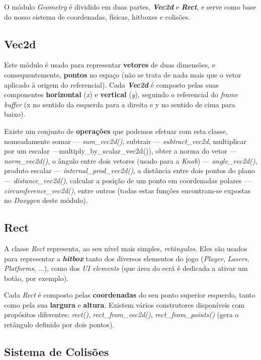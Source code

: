 \documentclass{report}
\begin{document}
O módulo \textit{Geometry} é dividido em duas partes, \textbf{\textit{Vec2d}} e \textbf{\textit{Rect}}, e serve como base do nosso sistema de coordenadas, físicas, hitboxes e colisões. 
\subsection{Vec2d}

Este módulo é usado para representar \textbf{vetores} de duas dimensões, e consequentemente, \textbf{pontos} no espaço (não se trata de nada mais que o vetor aplicado à origem do referencial). Cada \textbf{\textit{Vec2d}} é composto pelas suas componentes \textbf{horizontal} (\textit{x}) e \textbf{vertical} (\textit{y}), seguindo o referencial do \textit{frame buffer} (x no sentido da esquerda para a direita e y no sentido de cima para baixo).

Existe um conjunto de \textbf{operações} que podemos efetuar com esta classe, nomeadamente somar --- \textit{sum\_vec2d()}, subtrair --- \textit{subtract\_vec2d}, multiplicar por um escalar ---multiply\_by\_scalar\_vec2d()), obter a norma do vetor --- \textit{norm\_vec2d()}, o ângulo entre dois vetores (usado para a \textit{Knob}) --- \textit{angle\_vec2d()}, produto escalar --- \textit{internal\_prod\_vec2d()}, a distância entre dois pontos do plano --- \textit{distance\_vec2d()}, calcular a posição de um ponto em coordenadas polares --- \textit{circumference\_vec2d()}, entre outros (todas estas funções encontram-se expostas no \textit{Doxygen} deste módulo).

\subsection{Rect}

A classe \textit{Rect} representa, ao seu nível mais simples, \textit{retângulos}. Eles são usados para representar a \textbf{\textit{hitbox}} tanto dos diversos elementos do jogo (\textit{Player}, \textit{Lasers}, \textit{Platforms}, ...), como dos \textit{UI elements} (que área do ecrã é dedicada a ativar um botão, por exemplo).

Cada \textit{Rect} é composto pelas \textbf{coordenadas} do seu ponto superior esquerdo, tanto como pela sua \textbf{largura} e \textbf{altura}. Existem vários construtores disponíveis com propósitos diferentes: \textit{rect()}, \textit{rect\_from\_vec2d()}, \textit{rect\_from\_points()} (gera o retângulo definido por dois pontos).

\subsection{Sistema de Colisões}
\end{document}
